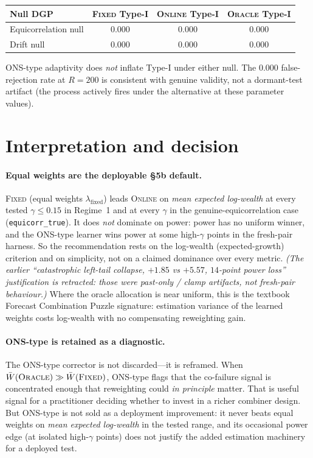 \documentclass[11pt]{article}
\begin{document}
\begin{center}
\begin{tabular}{lccc}
\toprule
Null DGP & \textsc{Fixed} Type-I & \textsc{Online} Type-I & \textsc{Oracle} Type-I\\
\midrule
Equicorrelation null & $0.000$ & $0.000$ & $0.000$ \\
Drift null           & $0.000$ & $0.000$ & $0.000$ \\
\bottomrule
\end{tabular}
\end{center}

ONS-type adaptivity does \emph{not} inflate Type-I under either null.
The $0.000$ false-rejection rate at $R=200$ is consistent with genuine validity, not a
dormant-test artifact (the process actively fires under the alternative at these parameter
values).

\section{Interpretation and decision}

\paragraph{Equal weights are the deployable \S5b default.}
\textsc{Fixed} (equal weights $\lambda_{\mathrm{fixed}}$) leads \textsc{Online} on
\emph{mean expected log-wealth} at every tested $\gamma\le 0.15$ in Regime~1 and at every
$\gamma$ in the genuine-equicorrelation case (\texttt{equicorr\_true}). It does \emph{not}
dominate on power: power has no uniform winner, and the ONS-type learner wins power at some
high-$\gamma$ points in the fresh-pair harness. So the recommendation rests on the
log-wealth (expected-growth) criterion and on simplicity, not on a claimed dominance over
every metric. \emph{(The earlier ``catastrophic left-tail collapse, $+1.85$ vs $+5.57$,
$14$-point power loss'' justification is retracted: those were past-only / clamp artifacts,
not fresh-pair behaviour.)}
Where the oracle allocation is near uniform, this is the textbook Forecast Combination Puzzle
signature: estimation variance of the learned weights costs log-wealth with no compensating
reweighting gain.

\paragraph{ONS-type is retained as a diagnostic.}
The ONS-type corrector is not discarded---it is reframed.
When $\bar{W}(\textsc{Oracle})\gg \bar{W}(\textsc{Fixed})$, ONS-type flags that the
co-failure signal is concentrated enough that reweighting could \emph{in principle}
matter.
That is useful signal for a practitioner deciding whether to invest in a richer
combiner design.
But ONS-type is not sold as a deployment improvement: it never beats equal weights on
\emph{mean expected log-wealth} in the tested range, and its occasional power edge (at
isolated high-$\gamma$ points) does not justify the added estimation machinery for a
deployed test.
\end{document}
